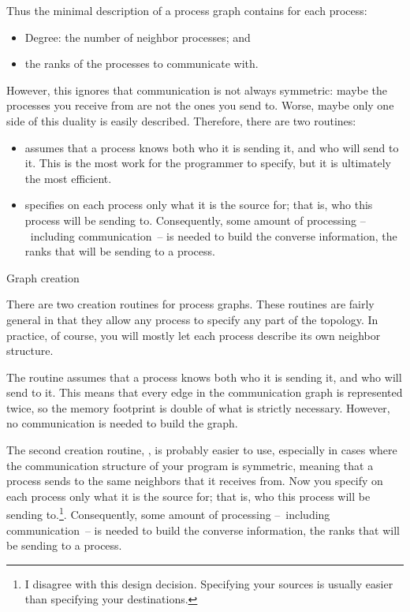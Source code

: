 Thus the minimal description of a process graph contains for each process:
\begin{itemize}
\item Degree: the number of neighbor processes; and
\item the ranks of the processes to communicate with.
\end{itemize}
However, this ignores that communication is not always symmetric:
maybe the processes you receive from are not the ones you send
to.
Worse, maybe only one side of this duality is easily described.
Therefore, there are two routines:
\begin{itemize}
\item {} assumes that a
  process knows both who it is sending it, and who will send to
  it. This is the most work for the programmer to specify, but it is
  ultimately the most efficient.
\item {} specifies on each process
  only what it is the source for; that is, who this process will be sending
  to. Consequently, some amount of processing
  --~including communication~-- is needed to build the converse
  information, the ranks that will be sending to a process.
\end{itemize}

 {Graph creation}

There are two creation routines for process graphs. These routines are
fairly general in that they allow any process to specify any part of
the topology. In practice, of course, you will mostly let each process
describe its own neighbor structure.

The routine  assumes that a process
knows both who it is sending it, and who will send to it. This means
that every edge in the communication graph is represented twice, so
the memory footprint is double of what is strictly necessary. However,
no communication is needed to build the graph.

The second creation routine, , is
probably easier to use, especially in cases where the communication
structure of your program is symmetric, meaning that a process sends
to the same neighbors that it receives from.  Now you specify on each
process only what it is the source for; that is, who this process will
be sending to.\footnote{I disagree with this design
  decision. Specifying your sources is usually easier than specifying
  your destinations.}. Consequently, some amount of processing
--~including communication~-- is needed to build the converse
information, the ranks that will be sending to a process.

